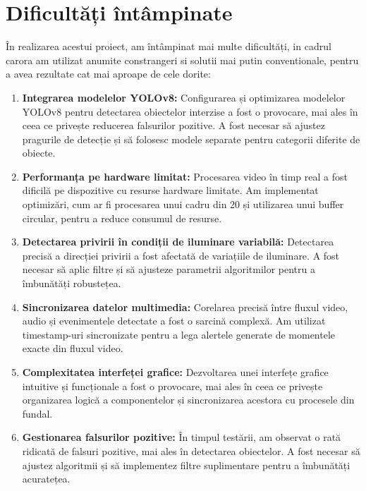 \documentclass[12pt,a4paper]{article}
\begin{document}
\section{Dificultăți întâmpinate}

În realizarea acestui proiect, am întâmpinat mai multe dificultăți, in cadrul carora am utilizat anumite constrangeri si solutii mai putin conventionale, pentru a avea rezultate cat mai aproape de cele dorite:

\begin{enumerate}
    \item \textbf{Integrarea modelelor YOLOv8:} Configurarea și optimizarea modelelor YOLOv8 pentru detectarea obiectelor interzise a fost o provocare, mai ales în ceea ce privește reducerea falsurilor pozitive. A fost necesar să ajustez pragurile de detecție și să folosesc modele separate pentru categorii diferite de obiecte.

    \item \textbf{Performanța pe hardware limitat:} Procesarea video în timp real a fost dificilă pe dispozitive cu resurse hardware limitate. Am implementat optimizări, cum ar fi procesarea unui cadru din 20 și utilizarea unui buffer circular, pentru a reduce consumul de resurse.

    \item \textbf{Detectarea privirii în condiții de iluminare variabilă:} Detectarea precisă a direcției privirii a fost afectată de variațiile de iluminare. A fost necesar să aplic filtre și să ajusteze parametrii algoritmilor pentru a îmbunătăți robustețea.

    \item \textbf{Sincronizarea datelor multimedia:} Corelarea precisă între fluxul video, audio și evenimentele detectate a fost o sarcină complexă. Am utilizat timestamp-uri sincronizate pentru a lega alertele generate de momentele exacte din fluxul video.

    \item \textbf{Complexitatea interfeței grafice:} Dezvoltarea unei interfețe grafice intuitive și funcționale a fost o provocare, mai ales în ceea ce privește organizarea logică a componentelor și sincronizarea acestora cu procesele din fundal.

    \item \textbf{Gestionarea falsurilor pozitive:} În timpul testării, am observat o rată ridicată de falsuri pozitive, mai ales în detectarea obiectelor. A fost necesar să ajustez algoritmii și să implementez filtre suplimentare pentru a îmbunătăți acuratețea.


\end{enumerate}
\end{document}
